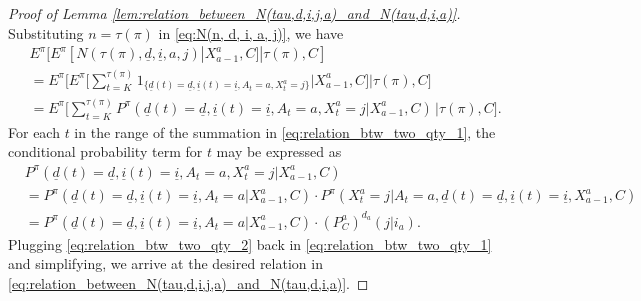 \begin{proof}[Proof of Lemma \ref{lem:relation_between_N(tau,d,i,j,a)_and_N(tau,d,i,a)}]
	Substituting $n=\tau(\pi)$ in \eqref{eq:N(n, d, i, a, j)}, we have
	\begingroup \allowdisplaybreaks\begin{align}
		&E^\pi[E^\pi[N(\tau(\pi),\underline{d},\underline{i},a,j)|X_{a-1}^a,C]|\tau(\pi),C]\nonumber\\
		&=E^\pi\bigg[E^\pi\bigg[\sum\limits_{t=K}^{\tau(\pi)} 1_{\{\underline{d}(t)=\underline{d},\underline{i}(t)=\underline{i},A_{t}=a,X_{t}^a=j\}}\bigg|X_{a-1}^a,C\bigg]\bigg|\tau(\pi),C\bigg]\nonumber\\
		&=E^\pi\bigg[\sum\limits_{t=K}^{\tau(\pi)}P^\pi(\underline{d}(t)=\underline{d},\underline{i}(t)=\underline{i},A_{t}=a,X_{t}^a=j|X_{a-1}^a,C)\,\bigg|\tau(\pi),C\bigg].\label{eq:relation_btw_two_qty_1}
	\end{align}\endgroup
	For each $t$ in the range of the summation in \eqref{eq:relation_btw_two_qty_1}, the conditional probability term for $t$ may be expressed as
	\begingroup \allowdisplaybreaks\begin{align}
		& P^\pi(\underline{d}(t)=\underline{d},\underline{i}(t)=\underline{i},A_{t}=a,X_{t}^a=j|X_{a-1}^a,C)\nonumber\\
		&=P^\pi(\underline{d}(t)=\underline{d},\underline{i}(t)=\underline{i},A_{t}=a|X_{a-1}^a,C)\cdot P^\pi(X_{t}^a=j|A_{t}=a,\underline{d}(t)=\underline{d},\underline{i}(t)=\underline{i},X_{a-1}^a,C)\nonumber\\
		&=P^\pi(\underline{d}(t)=\underline{d},\underline{i}(t)=\underline{i},A_{t}=a|X_{a-1}^a,C)\cdot (P_C^a)^{d_a}(j|i_a).\label{eq:relation_btw_two_qty_2}
	\end{align}\endgroup
	Plugging \eqref{eq:relation_btw_two_qty_2} back in \eqref{eq:relation_btw_two_qty_1} and simplifying, we arrive at the desired relation in \eqref{eq:relation_between_N(tau,d,i,j,a)_and_N(tau,d,i,a)}.
\end{proof}

